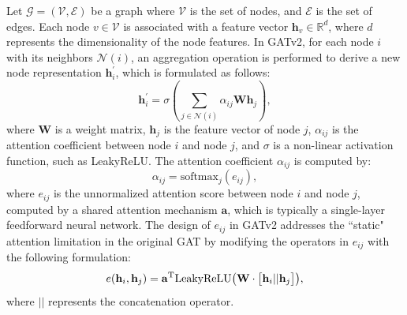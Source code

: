 \documentclass[conference,a4paper]{IEEEtran}
\begin{document}
Let $\mathcal{G} = (\mathcal{V}, \mathcal{E})$ be a graph where $\mathcal{V}$ is the set of nodes, and $\mathcal{E}$ is the set of edges. Each node $v \in \mathcal{V}$ is associated with a feature vector $\mathbf{h}_v \in \mathbb{R}^d$, where $d$ represents the dimensionality of the node features. In GATv2, for each node $i$ with its neighbors $\mathcal{N}(i)$, an aggregation operation is performed to derive a new node representation $\mathbf{h}^{\prime}_i$, which is formulated as follows:
\begin{equation}
   \mathbf{h}^{\prime}_i = \sigma \left( \sum_{j \in \mathcal{N}(i)} \alpha_{ij} \mathbf{W} \mathbf{h}_j \right),
\end{equation}
where
$\mathbf{W}$ is a weight matrix,
$\mathbf{h}_j$ is the feature vector of node $j$,
$\alpha_{ij}$ is the attention coefficient between node $i$ and node $j$, and
$\sigma$ is a non-linear activation function, such as LeakyReLU.
The attention coefficient $\alpha_{ij}$ is computed by:
\begin{equation}
    \alpha_{ij} = \text{softmax}_j \left( e_{ij} \right),
\end{equation}
where $e_{ij}$ is the unnormalized attention score between node $i$ and node $j$, computed by a shared attention mechanism $\mathbf{a}$, which  is typically a single-layer feedforward neural network. The design of $e_{ij}$ in GATv2 addresses  the ``static" attention  limitation  in the original GAT by modifying the operators in $e_{ij}$ with the following formulation:
\begin{equation}
    e(\mathbf{h}_i, \mathbf{h}_j) = \mathbf{a}^\textnormal{T}\text{LeakyReLU}\big(\mathbf{W}\cdot \big[\mathbf{h}_i || \mathbf{h}_j \big]\big),
\end{equation}
where $||$ represents the concatenation operator.
\end{document}

